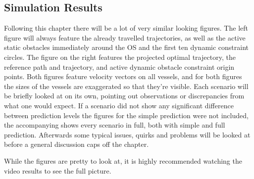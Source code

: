 \subsection{Simulation Results}
Following this chapter there will be a lot of very similar looking figures. The left figure will always feature the already travelled trajectories, %
as well as the active static obstacles immediately around the OS and the first ten dynamic constraint circles. The figure on the right features
the projected optimal trajectory, the reference path and trajectory, and active dynamic obstacle constraint origin points. Both
figures feature velocity vectors on all vessels, and for both figures the sizes of the vessels are exaggerated so that they're visible.
Each scenario will be briefly looked at on its own, pointing out observations or discrepancies from what one would expect. If a scenario did not show
any significant difference between prediction levels the figures for the simple prediction were not included, the accompanying shows
every scenario in full, both with simple and full prediction. Afterwards some typical issues, quirks and problems will be looked at before a general
discussion caps off the chapter.

While the figures are pretty to look at, it is highly recommended watching the video results to see the full picture.

